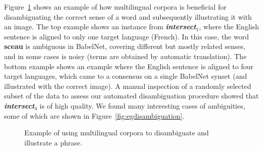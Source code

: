 \documentclass[twocolumn]{svjour3}          \smartqed  \usepackage{graphicx}
\begin{document}
Figure~\ref{fig:examplecleaning} shows an example of how multilingual corpora is beneficial for disambiguating the correct sense of a word and subsequently illustrating it with an image. The top example shows an instance from \textbf{\emph{intersect$_1$}},
where the English sentence is aligned to only one target language (French). In this case, the word \textbf{sceau} is ambiguous in BabelNet, covering different but mostly related senses, and in some cases is noisy (terms are obtained by automatic translation). The bottom example shows an example where the English sentence is aligned to four target languages, which came to a consensus on a single BabelNet synset (and illustrated with the correct image).
A manual inspection of a randomly selected subset of the data to assess our automated disambiguation procedure showed that \textbf{\emph{intersect$_4$}} is of high quality. We found many interesting cases of ambiguities, some of which are shown in Figure~\ref{fig:egdisambiguation}. 







\begin{figure}
\centering
{}
\caption{Example of using multilingual corpora to disambiguate and illustrate a phrase.}
\label{fig:examplecleaning}
\end{figure}
\end{document}
